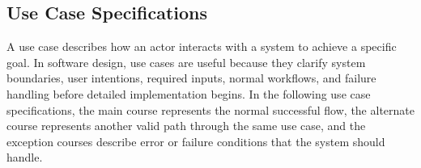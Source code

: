 \subsection{Use Case Specifications}

A use case describes how an actor interacts with a system to achieve a specific goal. In software design, use cases are useful because they clarify system boundaries, user intentions, required inputs, normal workflows, and failure handling before detailed implementation begins. In the following use case specifications, the main course represents the normal successful flow, the alternate course represents another valid path through the same use case, and the exception courses describe error or failure conditions that the system should handle.

\small
\renewcommand{\arraystretch}{1.18}

